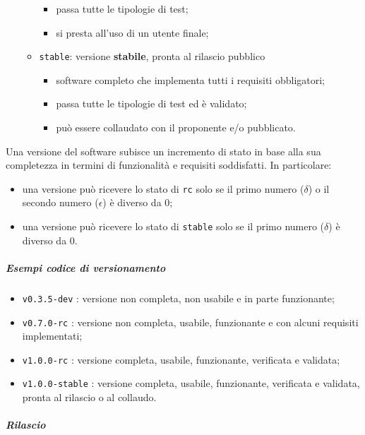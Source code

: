 \begin{itemize}
\begin{itemize}
\begin{itemize}
					\item passa tutte le tipologie di test;
					\item si presta all'uso di un utente finale;
				\end{itemize}
				\item \verb!stable!: versione \textbf{stabile}, pronta al rilascio pubblico
				\begin{itemize}
					\item software completo che implementa tutti i requisiti obbligatori;
					\item passa tutte le tipologie di test ed è validato;
					\item può essere collaudato con il proponente e/o pubblicato.
				\end{itemize}
			\end{itemize}
		\end{itemize}

		Una versione del software subisce un incremento di stato in base alla sua completezza in termini di funzionalità e requisiti soddisfatti. In particolare:
		\begin{itemize}
			\item una versione può ricevere lo stato di \verb!rc! solo se il primo numero (\(\delta\)) o il secondo numero (\(\epsilon\)) è diverso da 0;
			\item una versione può ricevere lo stato di \verb!stable! solo se il primo numero (\(\delta\)) è diverso da 0.
		\end{itemize}

		\subparagraph{Esempi codice di versionamento}

		\begin{itemize}
			\item \verb!v0.3.5-dev! : versione non completa, non usabile e in parte funzionante;
			\item \verb!v0.7.0-rc! : versione non completa, usabile, funzionante e con alcuni requisiti implementati;
			\item \verb!v1.0.0-rc! : versione completa, usabile, funzionante, verificata e validata;
			\item \verb!v1.0.0-stable! : versione completa, usabile, funzionante, verificata e validata, pronta al rilascio o al collaudo.
		\end{itemize}

		\subparagraph{Rilascio}

